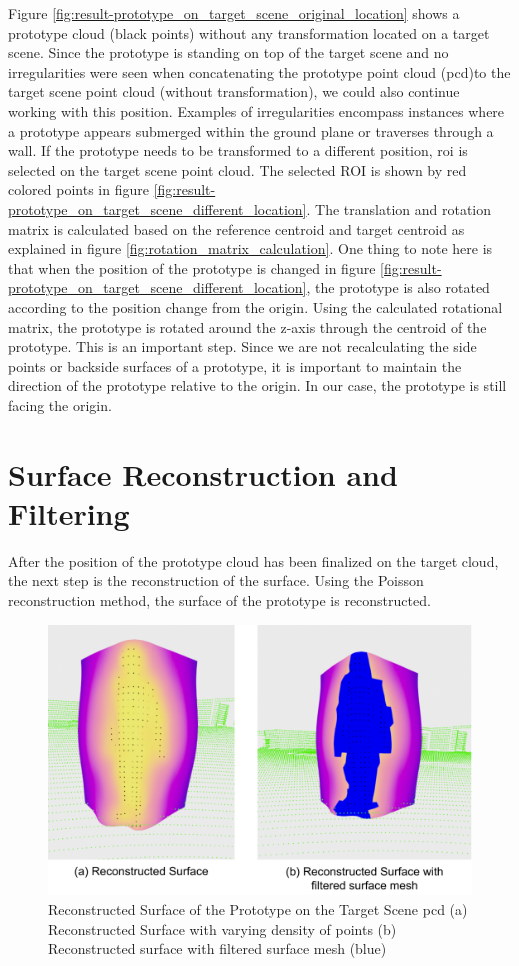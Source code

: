 Figure \ref{fig:result-prototype_on_target_scene_original_location} shows a prototype cloud (black points) without any transformation located on a target scene. Since the prototype is standing on top of the target scene and no irregularities were seen when concatenating the prototype point cloud (\acrshort{pcd})to the target scene point cloud (without transformation), we could also continue working with this position. Examples of irregularities encompass instances where a prototype appears submerged within the ground plane or traverses through a wall. If the prototype needs to be transformed to a different position, \acrfull{roi} is selected on the target scene point cloud. The selected ROI is shown by red colored points in figure \ref{fig:result-prototype_on_target_scene_different_location}. The translation and rotation matrix is calculated based on the reference centroid and target centroid as explained in figure \ref{fig:rotation_matrix_calculation}. One thing to note here is that when the position of the prototype is changed in figure \ref{fig:result-prototype_on_target_scene_different_location}, the prototype is also rotated according to the position change from the origin. Using the calculated rotational matrix, the prototype is rotated around the z-axis through the centroid of the prototype. This is an important step. Since we are not recalculating the side points or backside surfaces of a prototype, it is important to maintain the direction of the prototype relative to the origin. In our case, the prototype is still facing the origin.

\section{Surface Reconstruction and Filtering}
After the position of the prototype cloud has been finalized on the target cloud, the next step is the reconstruction of the surface. Using the Poisson reconstruction method, the surface of the prototype is reconstructed.

\begin{figure}[htbp]
    \centering
    \includegraphics[width=1\linewidth]{97_graphics/results/surface_reconstruction.pdf}
    \caption{Reconstructed Surface of the Prototype on the Target Scene \acrshort{pcd} (a) Reconstructed Surface with varying density of points (b) Reconstructed surface with filtered surface mesh (blue)}
    \label{fig:result-surface_reconstruction}
\end{figure}

